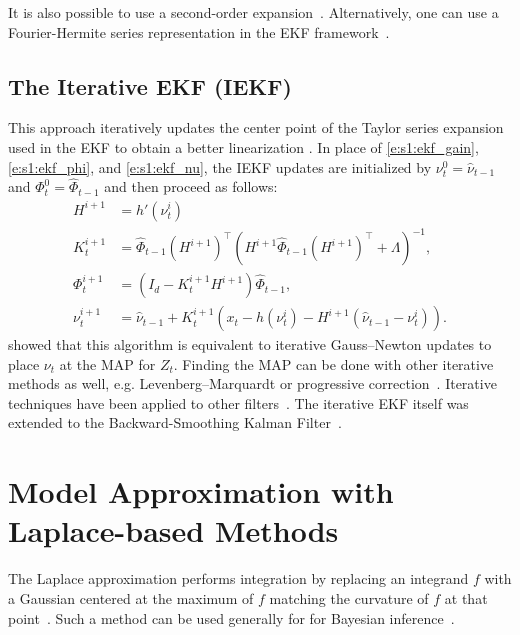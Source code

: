 It is also possible to use a second-order expansion~\cite{Ath68, Gus12}.  Alternatively, one can use a Fourier-Hermite series representation in the EKF framework~\cite{Sar12}.

\subsection{The Iterative EKF (IEKF)} 
This approach iteratively updates the center point of the Taylor series expansion used in the EKF to obtain a better linearization \cite{Fri66,Wis69}.  In place of \eqref{e:s1:ekf_gain}, \eqref{e:s1:ekf_phi}, and \eqref{e:s1:ekf_nu}, the IEKF updates are initialized by $\nu_t^0=\hat\nu_{t-1}$ and $\Phi_t^0=\hat\Phi_{t-1}$ and then proceed as follows:
\begin{align}
H^{i+1} &= h'(\nu_t^i) \label{e:s1:iekf_slope} \\
K_t^{i+1} &= \hat\Phi_{t-1} (H^{i+1})^\intercal( H^{i+1} \hat\Phi_{t-1} (H^{i+1})^\intercal + \Lambda)^{-1} \label{e:s1:iekf_gain}, \\
\Phi_t^{i+1} &= (I_d - K_t^{i+1}H^{i+1})\hat\Phi_{t-1} \label{e:s1:iekf_phi}, \\
\nu_t^{i+1} &= \hat\nu_{t-1} + K_t^{i+1}(x_t - h(\nu_t^i) -H^{i+1}(\hat\nu_{t-1}-\nu_t^i)) \label{e:s1:iekf_nu}.
\end{align}
\textcite{Bel93} showed that this algorithm is equivalent to iterative Gauss--Newton updates to place $\nu_t$ at the MAP for $Z_t$.  Finding the MAP can be done with other iterative methods as well, e.g. Levenberg--Marquardt or progressive correction~\cite{Fat12}.  Iterative techniques have been applied to other filters~\cite{Mur14}.  The iterative EKF itself was extended to the Backward-Smoothing Kalman Filter~\cite{Psi05,Psi13}.

\section{Model Approximation with Laplace-based Methods} 

The Laplace approximation performs integration by replacing an integrand $f$ with a Gaussian centered at the maximum of $f$ matching the curvature of $f$ at that point~\cite{Kas90,But07}.  Such a method can be used generally for for Bayesian inference~\cite{Koy10,Qua15}.


